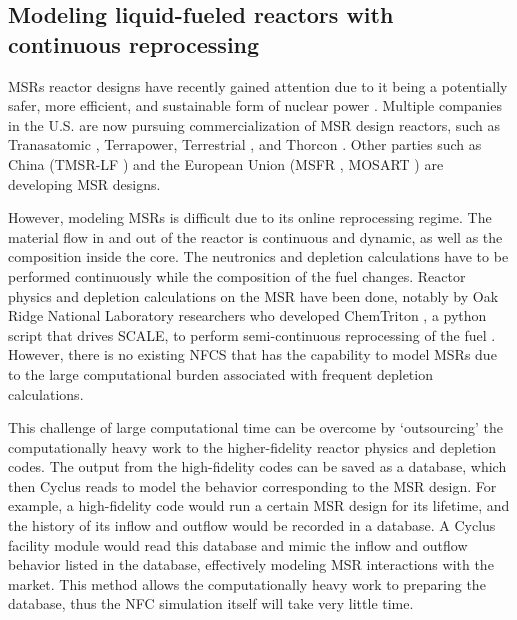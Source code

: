 \subsection{Modeling liquid-fueled reactors with continuous reprocessing}
\glspl{MSR} reactor designs have recently gained attention due to it being a
potentially safer, more efficient, and sustainable form of nuclear power
\cite{serp_molten_2014}. Multiple companies in the U.S. are now pursuing
commercialization of \gls{MSR} design reactors, such as Tranasatomic \cite{transatomic_technical_2016}
, Terrapower, Terrestrial \cite{leblanc_18-_2017}, and
Thorcon \cite{dolan_19-_2017}. Other parties such as China (TMSR-LF \cite{dai_17-_2017}) 
and the European Union (MSFR \cite{heuer_towards_2014}, MOSART \cite{ignatiev_molten_2014})
are developing \gls{MSR} designs.

However, modeling \glspl{MSR} is difficult due to its online reprocessing regime.
The material flow in and out of the reactor is continuous and dynamic, as well as the
composition inside the core.
The neutronics and depletion calculations have to be performed continuously while
the composition of the fuel changes. Reactor physics and depletion calculations
on the \gls{MSR} have been done, notably by 
 Oak Ridge National Laboratory researchers who developed
ChemTriton \cite{powers_new_2013}, a python script that drives SCALE,
to perform semi-continuous reprocessing of the fuel \cite{powers_inventory_2014, betzler_fuel_2018}.
However, there is no existing \gls{NFCS} that has the capability to model \glspl{MSR}
due to the large computational burden associated with frequent depletion calculations.

This challenge of large computational time can be overcome by `outsourcing' the computationally
heavy work to the higher-fidelity reactor physics and depletion codes. The output from the
high-fidelity codes can be saved as a database, which then Cyclus reads to model the behavior
corresponding to the \gls{MSR} design. For example, a high-fidelity code would run a certain
\gls{MSR} design for its lifetime, and the history of its inflow and outflow would be recorded
in a database. A Cyclus facility module would read this database and mimic the inflow and outflow
behavior listed in the database, effectively modeling \gls{MSR} interactions with the market.
This method allows the computationally heavy work to preparing the database, thus the \gls{NFC}
simulation itself will take very little time.